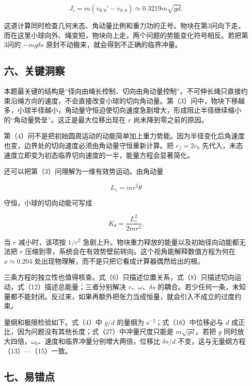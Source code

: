 \documentclass[12pt,a4paper,UTF8]{ctexart}
\begin{document}
\[J_c=m(v_{\theta,0}'-v_{\theta,0})\simeq0.3219m\sqrt{gd}.\]

这道计算同时检查几何末态、角动量比例和重力功的正号。物块在第3问向下走，而在这里小球向外、绳变短，物块向上走，两个问题的势能变化符号相反。若把第3问的
\(-mg\delta s\) 原封不动搬来，就会得到不正确的临界冲量。

\subsection{六、关键洞察}\label{ux516dux5173ux952eux6d1eux5bdf}

本题最关键的结构是``径向由绳长控制、切向由角动量控制''。不可伸长绳只直接约束沿绳方向的速度，不会直接改变小球的切向角动量。第（3）问中，物块下移越多，小球半径越小，角动量守恒迫使切向速度急剧增大，形成阻止半径继续缩小的``角动量势垒''。这正是最大位移出现在
\(r\) 尚未降到零之前的原因。

第（4）问不是把初始圆周运动的动能简单加上重力势能。因为半径变化后角速度也变，边界处的切向速度必须由角动量守恒重新计算。把
\(r_f=2r_0\)
先代入，末态速度立即变为初态临界切向速度的一半，能量方程会显著简化。

还可以把第（3）问理解为一维有效势运动。由角动量

\[
L_z=m r^2\dot\theta
\]

守恒，小球的切向动能可写成

\[
K_\theta=\frac{L_z^2}{2mr^2}.
\]

当 \(r\) 减小时，该项按 \(1/r^2\)
急剧上升。物块重力释放的能量以及初始径向动能都无法把 \(r\)
压缩到零，系统会在有效势壁前转向。这个视角能解释数值方程为何在
\(x\simeq0.204\) 处出现物理解，而不是只把它看成计算器偶然给出的根。

三条方程的独立性也值得核查。式（6）只描述位置关系，式（8）只描述切向运动，式（12）描述总能量；三者分别解决
\(r\)、\(\omega\)、\(\delta s\)
的耦合。若少任何一条，未知量都不能封闭。反过来，如果再额外把张力当成恒量，就会引入不成立的过度约束。

量纲和极限检验如下。式（4）中 \(g/d\) 的量纲为
\(\mathrm{s^{-2}}\)；式（16）中位移必与 \(d\)
成正比，因为问题没有其他长度；式（27）中冲量尺度只能是
\(m\sqrt{gd}\)。若把 \(g\)
同时放大四倍，\(\omega_0\)、速度和临界冲量分别增大两倍，位移比
\(\delta s/d\) 不变，这与无量纲方程（13）---（15）一致。

\subsection{七、易错点}\label{ux4e03ux6613ux9519ux70b9}
\end{document}
